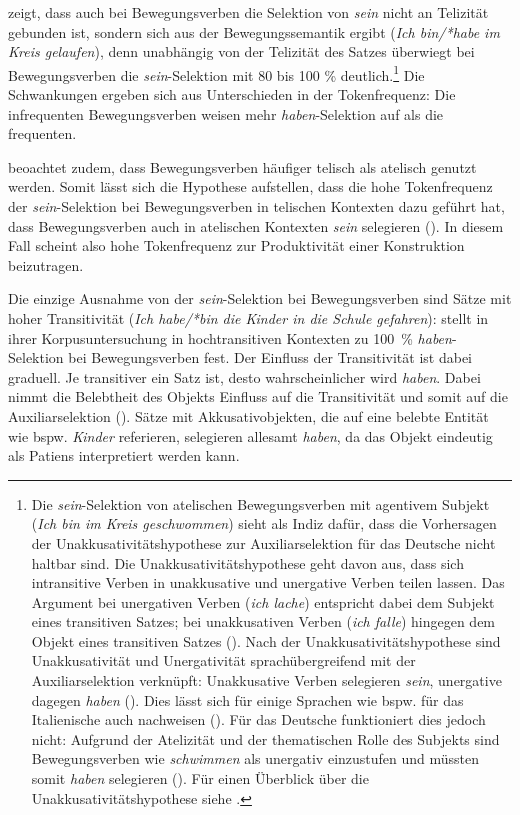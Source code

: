 \textcite[246--247]{Gillmann.2018} zeigt, dass auch bei Bewegungsverben die Selektion von \textit{sein} nicht an Telizität gebunden ist, sondern sich aus der Bewegungssemantik  ergibt (\textit{Ich bin/*ha\-be im Kreis gelaufen}), denn unabhängig von der Telizität des Satzes überwiegt bei Bewegungsverben die \textit{sein}-Selektion mit 80 bis 100 \% deutlich.\footnote{Die \textit{sein}-Selektion von atelischen Bewegungsverben mit agentivem Subjekt (\textit{Ich bin im Kreis geschwommen}) sieht \textcite[105--107]{Gillmann.2016} als Indiz dafür, dass die Vorhersagen der Unakkusativitätshypothese zur Auxiliarselektion für das Deutsche nicht haltbar sind. Die Unakkusativitätshypothese geht davon aus, dass sich intransitive Verben in unakkusative und unergative Verben teilen lassen. Das Argument bei unergativen Verben (\textit{ich lache}) entspricht dabei dem Subjekt eines transitiven Satzes; bei unakkusativen Verben (\textit{ich falle}) hingegen dem Objekt eines transitiven Satzes (\cite[95--96]{Gillmann.2016}). Nach der Unakkusativitätshypothese sind Unakkusativität und Unergativität sprachübergreifend mit der Auxiliarselektion verknüpft: Unakkusative Verben selegieren \textit{sein}, unergative dagegen \textit{haben} (\cite[100--101]{Gillmann.2016}). Dies lässt sich für einige Sprachen wie bspw. für das Italienische auch nachweisen (\cite[102--103]{Gillmann.2016}). Für das Deutsche funktioniert dies jedoch nicht: Aufgrund der Atelizität und der thematischen Rolle des Subjekts sind Bewegungsverben wie \textit{schwimmen}  als unergativ einzustufen und müssten somit \textit{haben} selegieren (\cite[105--107]{Gillmann.2016}). Für einen Überblick über die Unakkusativitätshypothese siehe \textcite{Alexiadou.2004}.} Die Schwankungen ergeben sich aus Unterschieden in der Tokenfrequenz: Die infrequenten Bewegungsverben weisen mehr \textit{haben}-Selektion auf als die frequenten. 


\textcite[246]{Gillmann.2018} beoachtet zudem, dass Bewegungsverben häufiger telisch als atelisch genutzt werden. Somit lässt sich die Hypothese aufstellen, dass die hohe Tokenfrequenz der \textit{sein}-Selektion bei Bewegungsverben in telischen Kontexten dazu geführt hat, dass  Bewegungsverben auch in atelischen Kontexten \textit{sein} selegieren (\cite[247]{Gillmann.2018}). In diesem Fall scheint also hohe Tokenfrequenz zur Produktivität einer Konstruktion beizutragen.

Die einzige Ausnahme von der \textit{sein}-Selektion bei Bewegungsverben sind Sätze mit hoher Transitivität (\textit{Ich habe/*bin die Kinder in die Schule gefahren}): \textcite[281--286]{Gillmann.2016} stellt in ihrer Korpusuntersuchung in hochtransitiven Kontexten zu 100~\% \textit{haben}-Selektion bei Bewegungsverben fest. Der Einfluss der Transitivität ist dabei graduell. Je transitiver ein Satz ist, desto wahrscheinlicher wird \textit{haben}. Dabei nimmt die Belebtheit des Objekts Einfluss auf die Transitivität und somit auf die Auxiliarselektion (\cite[280--302]{Gillmann.2016}). Sätze mit Akkusativobjekten, die auf eine belebte Entität wie bspw. \textit{Kinder} referieren, selegieren allesamt \textit{haben}, da das Objekt eindeutig als Patiens interpretiert werden kann. 



